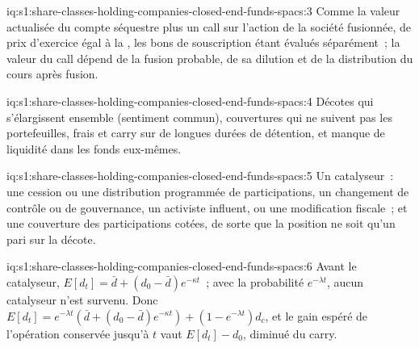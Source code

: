 \begin{solution}{iq:s1:share-classes-holding-companies-closed-end-funds-spacs:3}
Comme la valeur actualisée du compte séquestre plus un call sur l'action de la société fusionnée, de prix d'exercice égal à la , les bons de souscription étant évalués séparément~; la valeur du call dépend
de la fusion probable, de sa dilution et de la distribution du cours après fusion.
\end{solution}

\begin{solution}{iq:s1:share-classes-holding-companies-closed-end-funds-spacs:4}
Décotes qui s'élargissent ensemble (sentiment commun), couvertures qui ne suivent pas les portefeuilles, frais et carry sur de longues durées de détention, et manque de liquidité dans
les fonds eux-mêmes.
\end{solution}

\begin{solution}{iq:s1:share-classes-holding-companies-closed-end-funds-spacs:5}
Un catalyseur~: une cession ou une distribution programmée de participations, un changement de contrôle ou de gouvernance, un activiste influent, ou une modification fiscale~; et une couverture des
participations cotées, de sorte que la position ne soit qu'un pari sur la décote.
\end{solution}

\begin{solution}{iq:s1:share-classes-holding-companies-closed-end-funds-spacs:6}
Avant le catalyseur, $E[d_t] = \bar d + (d_0 - \bar d)e^{-\kappa t}$~; avec la probabilité $e^{-\lambda t}$, aucun catalyseur n'est survenu. Donc $E[d_t] = e^{-\lambda t}(\bar d +
(d_0 - \bar d)e^{-\kappa t}) + (1 - e^{-\lambda t})d_c$, et le gain espéré de l'opération conservée jusqu'à $t$ vaut $E[d_t] - d_0$, diminué du carry.
\end{solution}
